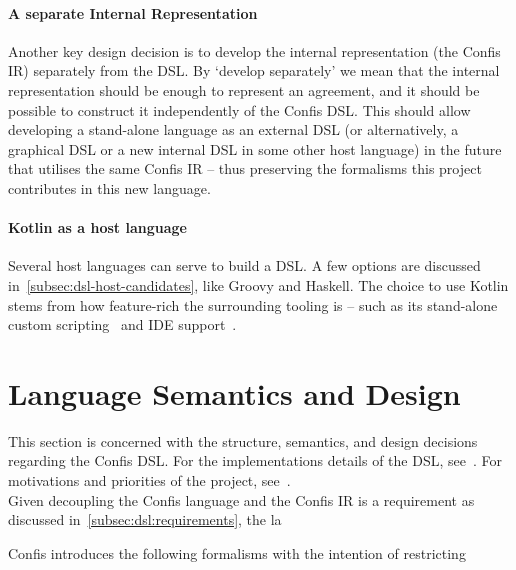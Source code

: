 \paragraph{A separate Internal Representation}
Another key design decision is to develop the internal representation (the Confis IR) separately from the DSL\@.
By `develop separately' we mean that the internal representation should be enough to represent an agreement, and it should be possible to construct it independently of the Confis DSL\@.
This should allow developing a stand-alone language as an external DSL (or alternatively, a graphical DSL or a new internal DSL in some other host language) in the future that utilises the same Confis IR -- thus preserving the formalisms this project contributes in this new language.

\paragraph{Kotlin as a host language} Several host languages can serve to build a DSL.
A few options are discussed in~\autoref{subsec:dsl-host-candidates}, like Groovy and Haskell.
The choice to use Kotlin stems from how feature-rich the surrounding tooling is -- such as its stand-alone custom scripting~\cite{kotlinScriptKeep} and IDE support~\cite{intelliJRepo}.\\


\section{Language Semantics and Design}\label{sec:language-semantics}

This section is concerned with the structure, semantics, and design decisions regarding the Confis DSL.
For the implementations details of the DSL, see~.
For motivations and priorities of the project, see~.\\

Given decoupling the Confis language and the Confis IR is a requirement as discussed in~\autoref{subsec:dsl:requirements}, the la

Confis introduces the following formalisms with the intention of restricting

\begin{definition}[Party]
    \label{def:party}
\end{definition}


